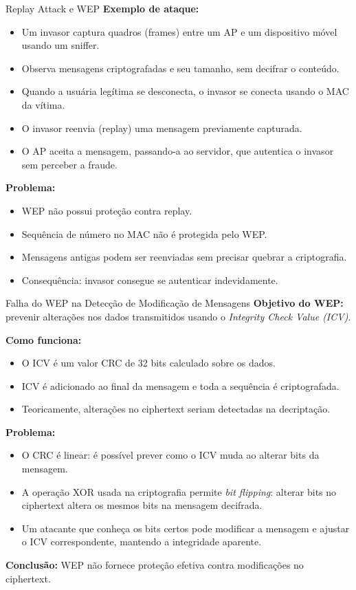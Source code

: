 \begin{frame}{Replay Attack e WEP}
\textbf{Exemplo de ataque:}
\begin{itemize}
    \item Um invasor captura quadros (frames) entre um AP e um dispositivo móvel usando um sniffer.
    \item Observa mensagens criptografadas e seu tamanho, sem decifrar o conteúdo.
    \item Quando a usuária legítima se desconecta, o invasor se conecta usando o MAC da vítima.
    \item O invasor reenvia (replay) uma mensagem previamente capturada.
    \item O AP aceita a mensagem, passando-a ao servidor, que autentica o invasor sem perceber a fraude.
\end{itemize}

\bigskip
\textbf{Problema:}
\begin{itemize}
    \item WEP não possui proteção contra replay.
    \item Sequência de número no MAC não é protegida pelo WEP.
    \item Mensagens antigas podem ser reenviadas sem precisar quebrar a criptografia.
    \item Consequência: invasor consegue se autenticar indevidamente.
\end{itemize}
\end{frame}

\begin{frame}{Falha do WEP na Detecção de Modificação de Mensagens}
\textbf{Objetivo do WEP:} prevenir alterações nos dados transmitidos usando o \textit{Integrity Check Value (ICV)}.

\medskip
\textbf{Como funciona:}
\begin{itemize}
    \item O ICV é um valor CRC de 32 bits calculado sobre os dados.
    \item ICV é adicionado ao final da mensagem e toda a sequência é criptografada.
    \item Teoricamente, alterações no ciphertext seriam detectadas na decriptação.
\end{itemize}

\medskip
\textbf{Problema:}
\begin{itemize}
    \item O CRC é linear: é possível prever como o ICV muda ao alterar bits da mensagem.
    \item A operação XOR usada na criptografia permite \textit{bit flipping}: alterar bits no ciphertext altera os mesmos bits na mensagem decifrada.
    \item Um atacante que conheça os bits certos pode modificar a mensagem e ajustar o ICV correspondente, mantendo a integridade aparente.
\end{itemize}

\medskip
\textbf{Conclusão:} WEP não fornece proteção efetiva contra modificações no ciphertext.
\end{frame}

